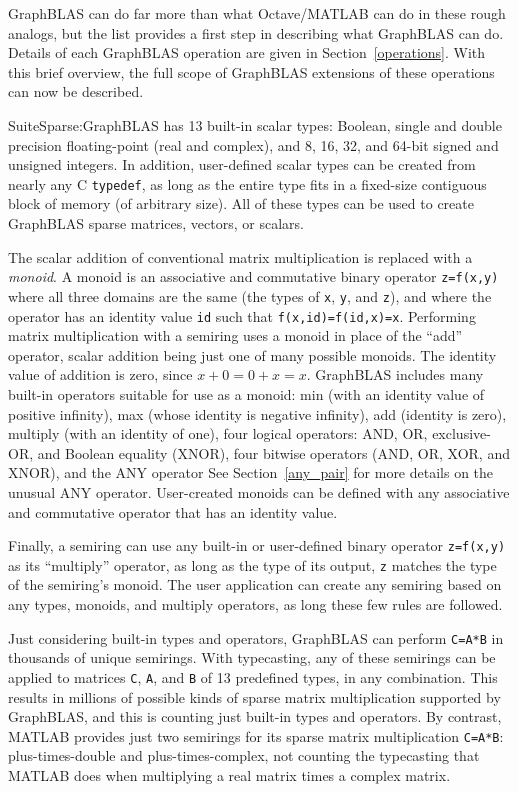 \documentclass[12pt]{article}
\begin{document}
GraphBLAS can do far more than what Octave/MATLAB can do in these rough
analogs, but the list provides a first step in describing what GraphBLAS can
do.  Details of each GraphBLAS operation are given in Section~\ref{operations}.
With this brief overview, the full scope of GraphBLAS extensions of these
operations can now be described.

SuiteSparse:GraphBLAS has 13 built-in scalar types: Boolean, single and double
precision floating-point (real and complex), and 8, 16, 32, and 64-bit signed
and unsigned integers.  In addition, user-defined scalar types can be created
from nearly any C \verb'typedef', as long as the entire type fits in a
fixed-size contiguous block of memory (of arbitrary size).  All of these types
can be used to create GraphBLAS sparse matrices, vectors, or scalars.

The scalar addition of conventional matrix multiplication is replaced with a
{\em monoid}.  A monoid is an associative and commutative binary operator
\verb'z=f(x,y)' where all three domains are the same (the types of \verb'x',
\verb'y', and \verb'z'), and where the operator has an identity value \verb'id'
such that \verb'f(x,id)=f(id,x)=x'.  Performing matrix multiplication with a
semiring uses a monoid in place of the ``add'' operator, scalar addition being
just one of many possible monoids.  The identity value of addition is zero,
since $x+0=0+x=x$.   GraphBLAS includes many built-in operators suitable for
use as a monoid: min (with an identity value of positive infinity), max (whose
identity is negative infinity), add (identity is zero), multiply (with an
identity of one), four logical operators: AND, OR, exclusive-OR, and
Boolean equality (XNOR), four bitwise operators (AND, OR, XOR, and XNOR),
and the ANY operator
See Section~\ref{any_pair} for more details on the unusual ANY operator.
User-created monoids can be defined with any associative and
commutative operator that has an identity value.

Finally, a semiring can use any built-in or user-defined binary operator
\verb'z=f(x,y)' as its ``multiply'' operator, as long as the type of its
output, \verb'z' matches the type of the semiring's monoid.
The user application can create any semiring based on any types, monoids,
and multiply operators, as long these few rules are followed.

Just considering built-in types and operators, GraphBLAS can perform
\verb'C=A*B' in thousands of unique semirings.  With typecasting, any of these
semirings can be applied to matrices \verb'C', \verb'A', and \verb'B' of 13
predefined types, in any combination.  This results in millions of possible
kinds of sparse matrix multiplication supported by GraphBLAS, and this is
counting just built-in types and operators.  By contrast, MATLAB provides just
two semirings for its sparse matrix multiplication \verb'C=A*B':
plus-times-double and plus-times-complex, not counting the typecasting that
MATLAB does when multiplying a real matrix times a complex matrix.
\end{document}
